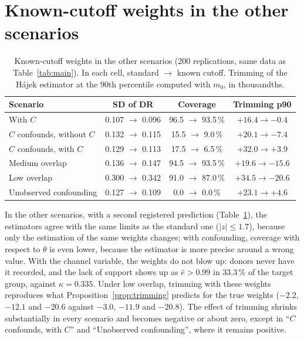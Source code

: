 \documentclass[11pt,a4paper]{article}
\theoremstyle{plain}
\theoremstyle{definition}
\begin{document}
\section{Known-cutoff weights in the other scenarios}\label{app:extra}

\begin{table}[ht]
\centering\small
\caption{Known-cutoff weights in the other scenarios (200 replications, same data as Table~\ref{tab:main}). In each cell, standard $\to$ known cutoff. Trimming of the Hájek estimator at the 90th percentile computed with $m_0$, in thousandths.}\label{tab:cutoff-scenarios}
\begin{tabular}{@{}lccc@{}}
\toprule
Scenario & SD of DR & Coverage & Trimming p90 \\
\midrule
With $C$ & 0.107 $\to$ 0.096 & 96.5 $\to$ 93.5\,\% & $+16.4\to-0.4$ \\
$C$ confounds, without $C$ & 0.132 $\to$ 0.115 & 15.5 $\to$ 9.0\,\% & $+20.1\to-7.4$ \\
$C$ confounds, with $C$ & 0.129 $\to$ 0.113 & 17.5 $\to$ 6.5\,\% & $+32.0\to+3.9$ \\
Medium overlap & 0.136 $\to$ 0.147 & 94.5 $\to$ 93.5\,\% & $+19.6\to-15.6$ \\
Low overlap & 0.300 $\to$ 0.342 & 91.0 $\to$ 87.0\,\% & $+34.5\to-20.6$ \\
Unobserved confounding & 0.127 $\to$ 0.109 & 0.0 $\to$ 0.0\,\% & $+23.1\to+4.6$ \\
\bottomrule
\end{tabular}
\end{table}

In the other scenarios, with a second registered prediction (Table~\ref{tab:cutoff-scenarios}), the estimators agree with the same limits as the standard one ($|z|\le1.7$), because only the estimation of the same weights changes; with confounding, coverage with respect to $\theta$ is even lower, because the estimator is more precise around a wrong value. With the channel variable, the weights do not blow up: donors never have it recorded, and the lack of support shows up as $\hat e>0.99$ in 33.3\,\% of the target group, against $\kappa=0.335$. Under low overlap, trimming with these weights reproduces what Proposition~\ref{prop:trimming} predicts for the true weights ($-2.2$, $-12.1$ and $-20.6$ against $-3.0$, $-11.9$ and $-20.8$). The effect of trimming shrinks substantially in every scenario and becomes negative or about zero, except in ``$C$ confounds, with $C$'' and ``Unobserved confounding'', where it remains positive.
\end{document}
